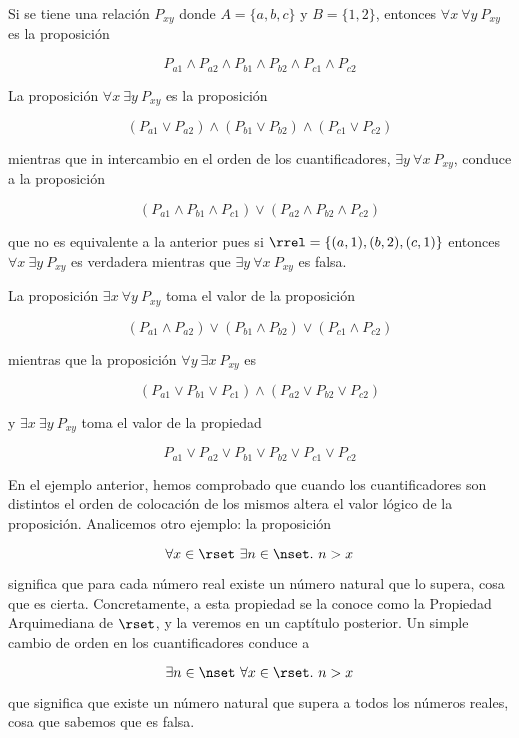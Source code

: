 \begin{example}
  Si se tiene una relación $P_{xy}$ donde $A = \{a, b, c\}$ y $B = \{1,
  2\}$, entonces $\forall x \ \forall y \ P_{xy}$ es la proposición

  \[ P_{a1} \land P_{a2} \land P_{b1} \land P_{b2} \land P_{c1} \land P_{c2}
  \]

  La proposición $\forall x \ \exists y \ P_{xy}$ es la proposición

  \[ (P_{a1} \lor P_{a2}) \land (P_{b1} \lor P_{b2}) \land (P_{c1} \lor
  P_{c2}) \]

  \noindent mientras que in intercambio en el orden de los cuantificadores,
  $\exists y \ \forall x \ P_{xy}$, conduce a la proposición

  \[ (P_{a1} \land P_{b1} \land P_{c1}) \lor (P_{a2} \land P_{b2} \land
  P_{c2}) \]

  \noindent que no es equivalente a la anterior pues si $\rrel = \{(a, 1),
  (b, 2), (c, 1)\}$ entonces $\forall x \ \exists y \ P_{xy}$ es verdadera
  mientras que $\exists y \ \forall x \ P_{xy}$ es falsa.

  La proposición $\exists x \ \forall y \ P_{xy}$ toma el valor de la
  proposición

  \[ (P_{a1} \land P_{a2}) \lor (P_{b1} \land P_{b2}) \lor (P_{c1} \land
  P_{c2}) \]

  \noindent mientras que la proposición $\forall y \ \exists x \ P_{xy}$ es

  \[ (P_{a1} \lor P_{b1} \lor P_{c1}) \land (P_{a2} \lor P_{b2} \lor P_{c2})
  \]

  \noindent y $\exists x \ \exists y \ P_{xy}$ toma el valor de la propiedad

  \[ P_{a1} \lor P_{a2} \lor P_{b1} \lor P_{b2} \lor P_{c1} \lor P_{c2} \]
\end{example}

\begin{example}
  En el ejemplo anterior, hemos comprobado que cuando los cuantificadores
  son distintos el orden de colocación de los mismos altera el valor lógico
  de la proposición. Analicemos otro ejemplo: la proposición

  \[ \forall x \in \rset \ \exists n \in \nset. \ n > x \]

  \noindent significa que para cada número real existe un número natural que
  lo supera, cosa que es cierta. Concretamente, a esta propiedad se la conoce
  como la Propiedad Arquimediana de $\rset$, y la veremos en un captítulo
  posterior. Un simple cambio de orden en los cuantificadores conduce a

  \[ \exists n \in \nset \ \forall x \in \rset. \ n > x \]

  \noindent que significa que existe un número natural que supera a todos los
  números reales, cosa que sabemos que es falsa.
\end{example}

